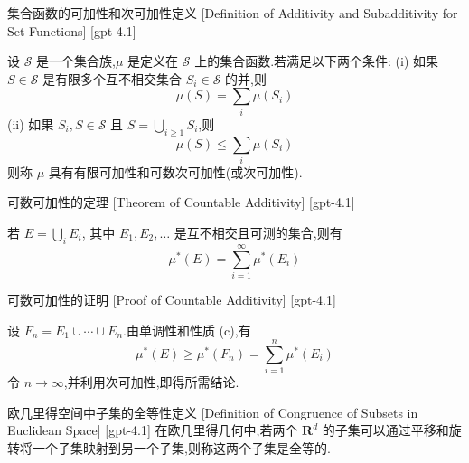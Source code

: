 \documentclass[UTF8]{ctexart}
\begin{document}
    
    
    \begin{dfn}
        {集合函数的可加性和次可加性定义}
        [Definition of Additivity and Subadditivity for Set Functions]
        [gpt-4.1]
        
设 $\boldsymbol{\mathcal{S}}$ 是一个集合族,$\mu$ 是定义在 $\boldsymbol{\mathcal{S}}$ 上的集合函数.若满足以下两个条件:
(i) 如果 $S \in \boldsymbol{\mathcal{S}}$ 是有限多个互不相交集合 $S_i \in \boldsymbol{\mathcal{S}}$ 的并,则
\[
\mu(S) = \sum_{i} \mu(S_i)
\]
(ii) 如果 $S_i, S \in \boldsymbol{\mathcal{S}}$ 且 $S = \bigcup_{i \geq 1} S_i$,则
\[
\mu(S) \leq \sum_{i} \mu(S_i)
\]
则称 $\mu$ 具有有限可加性和可数次可加性(或次可加性).

    \end{dfn}
    
    
    
    \begin{thm}
        {可数可加性的定理}
        [Theorem of Countable Additivity]
        [gpt-4.1]
        
若 $E = \bigcup _ { i } E _ { i }$, 其中 $E _ { 1 }, E _ { 2 }, \dots$ 是互不相交且可测的集合,则有
\[
\mu ^ { * } ( E ) = \sum _ { i = 1 } ^ { \infty } \mu ^ { * } ( E _ { i } )
\]

    \end{thm}
    
    
    
    \begin{prf}
        {可数可加性的证明}
        [Proof of Countable Additivity]
        [gpt-4.1]
        
设 $F _ { n } = E _ { 1 } \cup \cdots \cup E _ { n }$.由单调性和性质 (c),有
\[
\mu ^ { * } ( E ) \geq \mu ^ { * } ( F _ { n } ) = \sum _ { i = 1 } ^ { n } \mu ^ { * } ( E _ { i } )
\]
令 $n \to \infty$,并利用次可加性,即得所需结论.

    \end{prf}
    
    
    
    \begin{dfn}
        {欧几里得空间中子集的全等性定义}
        [Definition of Congruence of Subsets in Euclidean Space]
        [gpt-4.1]
        在欧几里得几何中,若两个 $\mathbf{R}^{d}$ 的子集可以通过平移和旋转将一个子集映射到另一个子集,则称这两个子集是全等的.
    \end{dfn}
    
\end{document}
